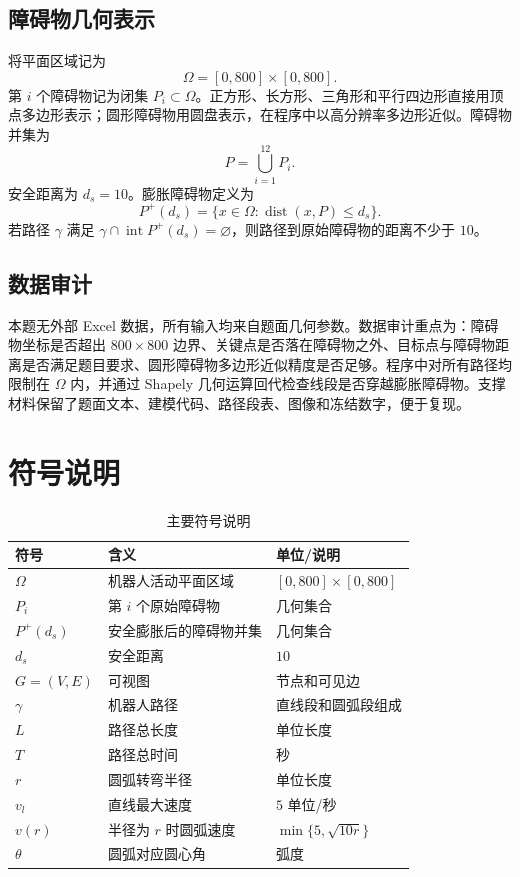 \documentclass[UTF8,a4paper,12pt]{ctexart}
\newcommand{\dist}{\operatorname{dist}}
\begin{document}
\subsection{障碍物几何表示}
将平面区域记为
\begin{equation}
\Omega=[0,800]\times[0,800].
\end{equation}
第 $i$ 个障碍物记为闭集 $P_i\subset \Omega$。正方形、长方形、三角形和平行四边形直接用顶点多边形表示；圆形障碍物用圆盘表示，在程序中以高分辨率多边形近似。障碍物并集为
\begin{equation}
P=\bigcup_{i=1}^{12}P_i.
\end{equation}
安全距离为 $d_s=10$。膨胀障碍物定义为
\begin{equation}
P^{+}(d_s)=\{x\in\Omega:\dist(x,P)\le d_s\}.
\end{equation}
若路径 $\gamma$ 满足 $\gamma\cap \operatorname{int}P^{+}(d_s)=\varnothing$，则路径到原始障碍物的距离不少于 $10$。

\subsection{数据审计}
本题无外部 Excel 数据，所有输入均来自题面几何参数。数据审计重点为：障碍物坐标是否超出 $800\times800$ 边界、关键点是否落在障碍物之外、目标点与障碍物距离是否满足题目要求、圆形障碍物多边形近似精度是否足够。程序中对所有路径均限制在 $\Omega$ 内，并通过 Shapely 几何运算回代检查线段是否穿越膨胀障碍物。支撑材料保留了题面文本、建模代码、路径段表、图像和冻结数字，便于复现。

\section{符号说明}
\begin{table}[H]
\centering
\caption{主要符号说明}
\begin{tabular}{lll}
\toprule
符号 & 含义 & 单位/说明\\
\midrule
$\Omega$ & 机器人活动平面区域 & $[0,800]\times[0,800]$\\
$P_i$ & 第 $i$ 个原始障碍物 & 几何集合\\
$P^+(d_s)$ & 安全膨胀后的障碍物并集 & 几何集合\\
$d_s$ & 安全距离 & $10$\\
$G=(V,E)$ & 可视图 & 节点和可见边\\
$\gamma$ & 机器人路径 & 直线段和圆弧段组成\\
$L$ & 路径总长度 & 单位长度\\
$T$ & 路径总时间 & 秒\\
$r$ & 圆弧转弯半径 & 单位长度\\
$v_l$ & 直线最大速度 & $5$ 单位/秒\\
$v(r)$ & 半径为 $r$ 时圆弧速度 & $\min\{5,\sqrt{10r}\}$\\
$\theta$ & 圆弧对应圆心角 & 弧度\\
\bottomrule
\end{tabular}
\end{table}
\end{document}
